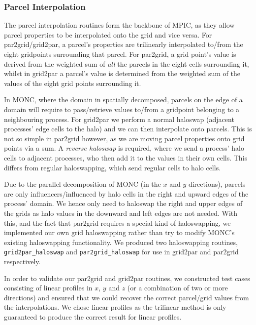 \documentclass{article}
\begin{document}
\subsubsection{Parcel Interpolation}
The parcel interpolation routines form the backbone of MPIC, as they allow parcel properties to be interpolated onto the grid and vice versa. For par2grid/grid2par, a parcel's properties are trilinearly interpolated to/from the eight gridpoints surrounding that parcel. For par2grid, a grid point's value is derived from the weighted sum of \emph{all} the parcels in the eight cells surrounding it, whilst in grid2par a parcel's value is determined from the weighted sum of the values of the eight grid points surrounding it.

In MONC, where the domain in spatially decomposed, parcels on the edge of a domain will require to pass/retrieve values to/from a gridpoint belonging to a neighbouring process. For grid2par we perform a normal haloswap (adjacent processes' edge cells to the halo) and we can then interpolate onto parcels. This is not so simple in par2grid however, as we are moving parcel properties onto grid points via a sum. A \emph{reverse haloswap} is required, where we send a process' halo cells to adjacent processes, who then add it to the values in their own cells. This differs from regular haloswapping, which send regular cells to halo cells.

Due to the parallel decomposition of MONC (in the $x$ and $y$ directions), parcels are only influencers/influenced by halo cells in the right and upward edges of the process' domain. We hence only need to haloswap the right and upper edges of the grids as halo values in the downward and left edges are not needed. With this, and the fact that par2grid requires a special kind of haloswapping, we implemented our own grid haloswapping rather than try to modify MONC's existing haloswapping functionality. We produced two haloswapping routines, \verb|grid2par_haloswap| and \verb|par2grid_haloswap| for use in grid2par and par2grid respectively.

In order to validate our par2grid and grid2par routines, we constructed test cases consisting of linear profiles in $x$, $y$ and $z$ (or a combination of two or more directions) and ensured that we could recover the correct parcel/grid values from the interpolations. We chose linear profiles as the trilinear method is only guaranteed to produce the correct result for linear profiles.
\end{document}
